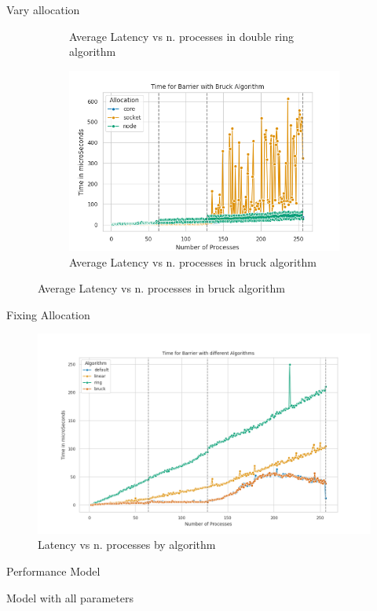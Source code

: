 \documentclass[11pt]{beamer}
\begin{document}
\begin{frame}{Vary allocation}
\begin{figure}[h]
\begin{subfigure}{0.45\textwidth}
			\caption{Average Latency vs n. processes in double ring algorithm}
			\label{fig:barrierring}
		\end{subfigure}
		\begin{subfigure}{0.45\textwidth}
			\centering
			\includegraphics[width=0.7\linewidth]{../exercise1/plots/barrier_bruck}
			\caption{Average Latency vs n. processes in bruck algorithm}
			\label{fig:barrierbruck}
		\end{subfigure}
	\end{figure}
\end{frame}

\begin{frame}{Fixing Allocation}
	\begin{figure}[h]
		\centering
		\includegraphics[width=0.7\linewidth]{../exercise1/plots/barrier_core}
		\caption{Latency vs n. processes by algorithm}
		\label{fig:barriercore}
	\end{figure}
\end{frame}

\begin{frame}{Performance Model}
	\begin{center}
		
	\end{center}
	Model with all parameters %
\end{frame}
\end{document}

